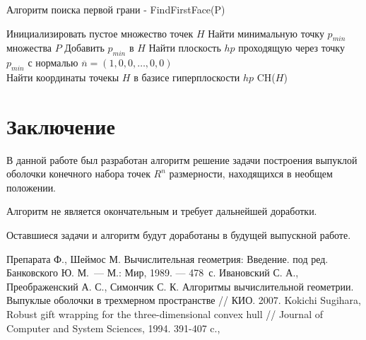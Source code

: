 \documentclass[a4paper,14pt]{extarticle}  %
\begin{document}
\begin{algorithm*}[H]
    \caption{Алгоритм поиска первой грани - FindFirstFace(P)}
    \label{alg:firstFace}
    \DontPrintSemicolon
    Инициализировать пустое множество точек $H$\;
    Найти минимальную точку $p_{min}$ множества $P$\;
    Добавить $p_{min}$ в $H$\;
    Найти плоскость $hp$ проходящую через точку $p_{min}$ с нормалью $\overline{n} = (1,0,0,\ldots,0,0)$\\
    Найти координаты точекы $H$ в базисе гиперплоскости $hp$ \label{firstPlane :crdbasis}\;
\Return CH($H$)
\end{algorithm*}
\newpage
\section*{Заключение}
В данной работе был разработан алгоритм решение задачи построения выпуклой оболочки конечного набора точек $R^n$ размерности, находящихся в необщем положении.



Алгоритм не является окончательным и требует дальнейшей доработки.

Оставшиеся задачи и алгоритм будут доработаны в будущей выпускной работе.
\newpage

\newpage
{}
\begin{thebibliography}{}
	 Препарата Ф., Шеймос М. Вычислительная геометрия: Введение. под ред. Банковского Ю. М.~--- М.: Мир, 1989. --- 478~с.
     Ивановский С. А., Преображенский А. С., Симончик С. К. Алгоритмы вычислительной геометрии. Выпуклые оболочки в трехмерном пространстве // КИО. 2007.
     Kokichi Sugihara,
    Robust gift wrapping for the three-dimensional convex hull //
    Journal of Computer and System Sciences,
    1994.
    391-407 c.,
\end{thebibliography}
\end{document}
